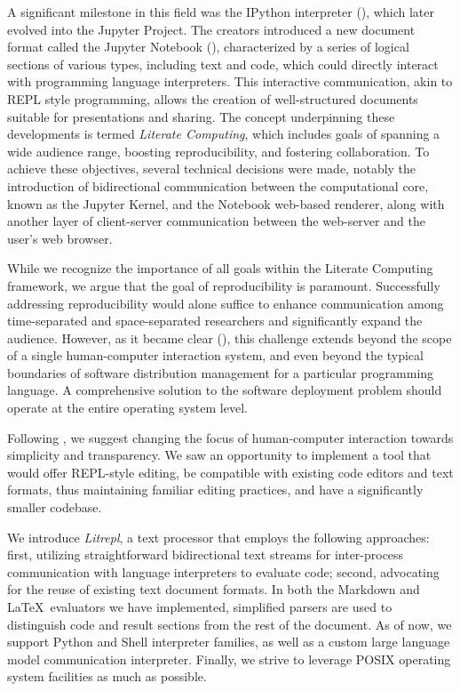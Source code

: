 \documentclass[letterpaper,12pt,twocolumn]{article}
\begin{document}
A significant milestone in this field was the IPython interpreter
(\textcite{Perez2007IPython}), which later evolved into the Jupyter Project. The
creators introduced a new document format called the Jupyter Notebook
(\textcite{Kluyver2016jupnb}), characterized by a series of logical sections of
various types, including text and code, which could directly interact with
programming language interpreters. This interactive communication, akin to REPL
style programming, allows the creation of well-structured documents suitable for
presentations and sharing. The concept underpinning these developments is termed
\textit{Literate Computing}\cite{Perez2015blog}, which includes goals of
spanning a wide audience range, boosting reproducibility, and fostering
collaboration. To achieve these objectives, several technical decisions were
made, notably the introduction of bidirectional communication between the
computational core, known as the Jupyter Kernel, and the Notebook web-based
renderer, along with another layer of client-server communication between the
web-server and the user’s web browser.

While we recognize the importance of all goals within the Literate Computing
framework, we argue that the goal of reproducibility is paramount. Successfully
addressing reproducibility would alone suffice to enhance communication among
time-separated and space-separated researchers and significantly expand the
audience. However, as it became clear (\textcite{Dolstra2010}), this challenge
extends beyond the scope of a single human-computer interaction system, and even
beyond the typical boundaries of software distribution management for a
particular programming language. A comprehensive solution to the software
deployment problem should operate at the entire operating system level.

Following \textcite{Vallet2022}, we suggest changing the focus of human-computer
interaction towards simplicity and transparency. We saw an opportunity to
implement a tool that would offer REPL-style editing, be compatible with
existing code editors and text formats, thus maintaining familiar editing
practices, and have a significantly smaller codebase.

We introduce \textit{Litrepl}, a text processor that employs the following
approaches: first, utilizing straightforward bidirectional text streams for
inter-process communication with language interpreters to evaluate code; second,
advocating for the reuse of existing text document formats. In both the Markdown
and \LaTeX\ evaluators we have implemented, simplified parsers are used to
distinguish code and result sections from the rest of the document. As of now,
we support Python and Shell interpreter families, as well as a custom large
language model communication interpreter. Finally, we strive to leverage
POSIX\cite{POSIX2024} operating system facilities as much as possible.
\end{document}
